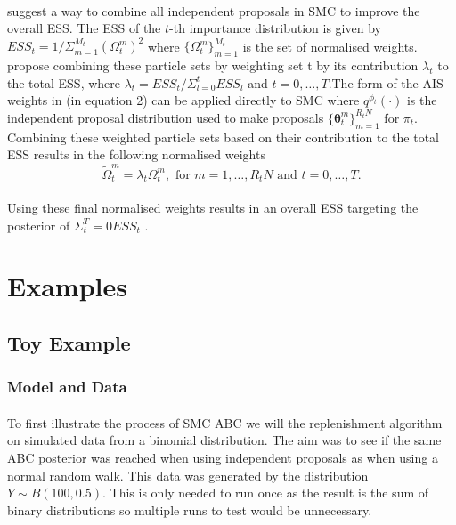 \documentclass[12,fleqn]{article}
\theoremstyle{definition}
\theoremstyle{plain}
\begin{document}
\paragraph{}
 suggest a way to combine all independent proposals in SMC to improve the overall ESS. The ESS of the $t$-th importance distribution is given by $ESS_t = 1/\Sigma^{M_t}_{m=1} (\Omega^m_t)^2$ where $\{ \Omega^m_t \}^{M_t}_{m=1}$ is the set of normalised weights.  propose combining these particle sets by weighting set t by its contribution $\lambda_t$ to the total ESS, where $\lambda_t = ESS_t / \Sigma^t_{l=0} ESS_l$ and $t = 0, \ldots , T$.The form of the AIS weights in (in equation 2) can be applied directly to SMC where $q^{\phi_t}(\cdot)$ is the independent proposal distribution used to make proposals $\{ \boldsymbol{\theta}^m_t \}^{R_t N}_{m=1} $ for $\pi_t$. Combining these weighted particle sets based on their contribution to the total ESS results in the following normalised weights
\begin{equation*}
\tilde{\Omega}^m_t = \lambda_t \Omega^m_t , \text{ for } m = 1, \ldots , R_t N \text{  and   } t = 0, \ldots, T.
 \end{equation*}
\paragraph{}
Using these final normalised weights results in an overall ESS targeting the posterior of $\Sigma^T_t=0 ESS_t$ \cite{quteprints101729}.
\par

\section{Examples}
\subsection{Toy Example}
\subsubsection{Model and Data}
\paragraph{}
To first illustrate the process of SMC ABC we will the  replenishment algorithm on simulated data from a binomial distribution. The aim was to see if the same ABC posterior was reached when using independent proposals as when using a normal random walk.
This data was generated by the distribution $Y \sim B(100, 0.5)$. This is only needed to run once as the result is the sum of binary distributions so multiple runs to test would be unnecessary.
\par
\end{document}

